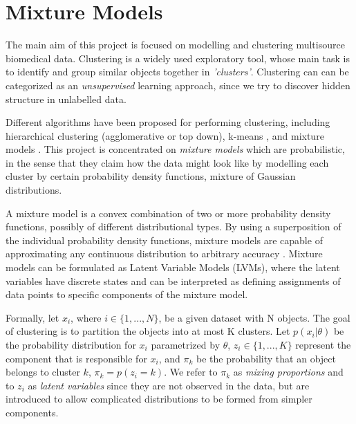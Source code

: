 \section{Mixture Models} \label{mixture-models-s}

The main aim of this project is focused on modelling and clustering multisource biomedical data. Clustering is a widely used exploratory tool, whose main task is to identify and group similar objects together in \emph{'clusters'}. Clustering can can be categorized as an \emph{unsupervised} learning approach, since we try to discover hidden structure in unlabelled data.     

Different algorithms have been proposed for performing clustering, including hierarchical clustering (agglomerative or top down), k-means \citep{MacQueen1967}, and mixture models \citep{McLachlan1988}. This project is concentrated on \emph{mixture models} which are probabilistic, in the sense that they claim how the data might look like by modelling each cluster by certain probability density functions, \eg mixture of Gaussian distributions.  

A mixture model is a convex combination of two or more probability density functions, possibly of different distributional types. By using a superposition of the individual probability density functions, mixture models are capable of approximating any continuous distribution to arbitrary accuracy \citep{Marin2005}. Mixture models can be formulated as Latent Variable Models (LVMs), where the latent variables have discrete states and can be interpreted as defining assignments of data points to specific components of the mixture model.

Formally, let $x_{i}$, where $i \in \lbrace 1, ... , N \rbrace$, be a given dataset with N objects. The goal of clustering is to partition the objects into at most K clusters. Let $p(x_{i}|\theta)$ be the probability distribution for $x_{i}$ parametrized by $\theta$, $z_{i} \in \lbrace 1,...,K \rbrace$ represent the component that is responsible for $x_{i}$, and $\pi_{k}$ be the probability that an object belongs to cluster $k$, \ie $\pi_{k} = p(z_{i} = k)$. We refer to $\pi_{k}$ as \emph{mixing proportions} and to $z_{i}$ as \emph{latent variables} since they are not observed in the data, but are introduced to allow complicated distributions to be formed from simpler components. 

